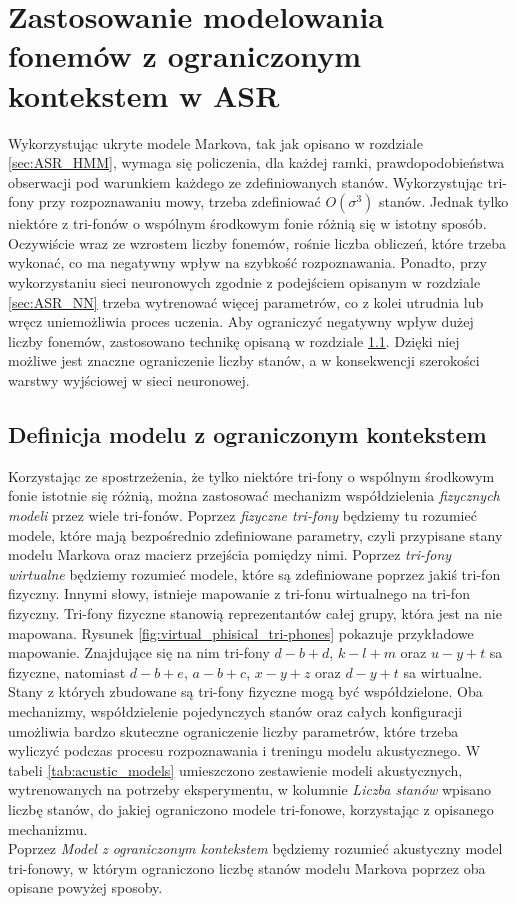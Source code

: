 \documentclass[11pt]{article}
\begin{document}
\section{ Zastosowanie modelowania fonemów z ograniczonym kontekstem w ASR }	
	Wykorzystując ukryte modele Markova, tak jak opisano w rozdziale \ref{sec:ASR_HMM}, wymaga się policzenia, dla każdej ramki, prawdopodobieństwa obserwacji pod warunkiem każdego ze zdefiniowanych stanów. Wykorzystując tri-fony przy rozpoznawaniu mowy, trzeba zdefiniować $O(\sigma^3)$ stanów. Jednak tylko niektóre z tri-fonów o wspólnym środkowym fonie różnią się w istotny sposób. Oczywiście wraz ze wzrostem liczby fonemów, rośnie liczba obliczeń, które trzeba wykonać, co ma negatywny wpływ na szybkość rozpoznawania. Ponadto, przy wykorzystaniu sieci neuronowych zgodnie z podejściem opisanym w rozdziale \ref{sec:ASR_NN} trzeba wytrenować więcej parametrów, co z kolei utrudnia lub wręcz uniemożliwia proces uczenia. Aby ograniczyć negatywny wpływ dużej liczby fonemów, zastosowano technikę opisaną w rozdziale \ref{sec:tri-fone_mapping}. Dzięki niej możliwe jest znaczne ograniczenie liczby stanów, a w konsekwencji szerokości warstwy wyjściowej w sieci neuronowej.
	
	\subsection{ Definicja modelu z ograniczonym kontekstem }
		\label{sec:tri-fone_mapping}
		Korzystając ze spostrzeżenia, że tylko niektóre tri-fony o wspólnym środkowym fonie istotnie się różnią, można zastosować mechanizm współdzielenia \textit{fizycznych modeli} przez wiele tri-fonów. Poprzez \textit{fizyczne tri-fony} będziemy tu rozumieć modele, które mają bezpośrednio zdefiniowane parametry, czyli przypisane stany modelu Markova oraz macierz przejścia pomiędzy nimi. Poprzez \textit{tri-fony wirtualne} będziemy rozumieć modele, które są zdefiniowane poprzez jakiś tri-fon fizyczny. Innymi słowy, istnieje mapowanie z tri-fonu wirtualnego na tri-fon fizyczny. Tri-fony fizyczne stanowią reprezentantów całej grupy, która jest na nie mapowana. Rysunek \ref{fig:virtual_phisical_tri-phones} pokazuje przykładowe mapowanie. Znajdujące się na nim tri-fony $d-b+d$, $k-l+m$ oraz $u-y+t$ sa fizyczne, natomiast $d-b+e$, $a-b+c$, $x-y+z$ oraz $d-y+t$ sa wirtualne. Stany z których zbudowane są tri-fony fizyczne mogą być współdzielone. Oba mechanizmy, współdzielenie pojedynczych stanów oraz całych konfiguracji umożliwia bardzo skuteczne ograniczenie liczby parametrów, które trzeba wyliczyć podczas procesu rozpoznawania i treningu modelu akustycznego. W tabeli \ref{tab:acustic_models} umieszczono zestawienie modeli akustycznych, wytrenowanych na potrzeby eksperymentu, w kolumnie \textit{Liczba stanów} wpisano liczbę stanów, do jakiej ograniczono modele tri-fonowe, korzystając z opisanego mechanizmu. \\
		Poprzez \textit{Model z ograniczonym kontekstem} będziemy rozumieć akustyczny model tri-fonowy, w którym ograniczono liczbę stanów modelu Markova poprzez oba opisane powyżej sposoby.
		
\end{document}
